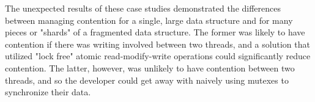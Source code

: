 The unexpected results of these case studies demonstrated the differences between managing contention for a single, large data structure and for many pieces or "shards" of a fragmented data structure. The former was likely to have contention if there was writing involved between two threads, and a solution that utilized "lock free" atomic read-modify-write operations could significantly reduce contention. The latter, however, was unlikely to have contention between two threads, and so the developer could get away with naively using mutexes to synchronize their data.




